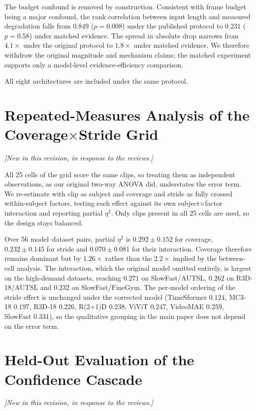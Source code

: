\documentclass[runningheads]{llncs}
\newcommand{\rev}[1]{\textcolor{revblue}{#1}}
\newcommand{\revnote}{\noindent\textcolor{revblue}{\small\itshape
  [New in this revision, in response to the reviews.]}\par\vspace{2pt}}
\begin{document}
The budget confound is removed by construction. Consistent with frame budget
being a major confound,
the rank correlation between input length and measured degradation falls from
$0.849$ ($p{=}0.008$) under the published protocol to $0.231$ ($p{=}0.58$) under
matched evidence.
The spread in absolute drop narrows from $4.1\times$ under the original protocol
to $1.8\times$ under matched evidence. We therefore withdraw the original
magnitude and mechanism claims; the matched experiment supports only a
model-level evidence-efficiency comparison.

\rev{All eight architectures are included under the same protocol.}

\section{\rev{Repeated-Measures Analysis of the Coverage\texorpdfstring{$\times$}{x}Stride Grid}}
\revnote
\label{sec:sup_rmanova}

All 25 cells of the grid score the same clips, so treating them as independent
observations, as our original two-way ANOVA did, understates the error term. We
re-estimate with clip as subject and coverage and stride as fully crossed
within-subject factors, testing each effect against its own subject$\times$factor
interaction and reporting partial $\eta^2$. Only clips present in all 25 cells
are used, so the design stays balanced.

Over 56 model--dataset pairs, partial $\eta^2$ is $0.292\pm0.152$ for coverage,
$0.232\pm0.145$ for stride and $0.070\pm0.081$ for their interaction. Coverage
therefore remains dominant but by $1.26\times$ rather than the $2.2\times$
implied by the between-cell analysis. The interaction, which the original model
omitted entirely, is largest on the high-demand datasets, reaching $0.271$ on
SlowFast/AUTSL, $0.262$ on R3D-18/AUTSL and $0.232$ on SlowFast/FineGym. The
per-model ordering of the stride effect is unchanged under the corrected model
(TimeSformer $0.124$, MC3-18 $0.197$, R3D-18 $0.226$, R(2+1)D $0.238$, ViViT
$0.247$, VideoMAE $0.259$, SlowFast $0.331$), so the qualitative grouping in the
main paper does not depend on the error term.

\section{\rev{Held-Out Evaluation of the Confidence Cascade}}
\revnote
\label{sec:sup_routing_heldout}
\end{document}
